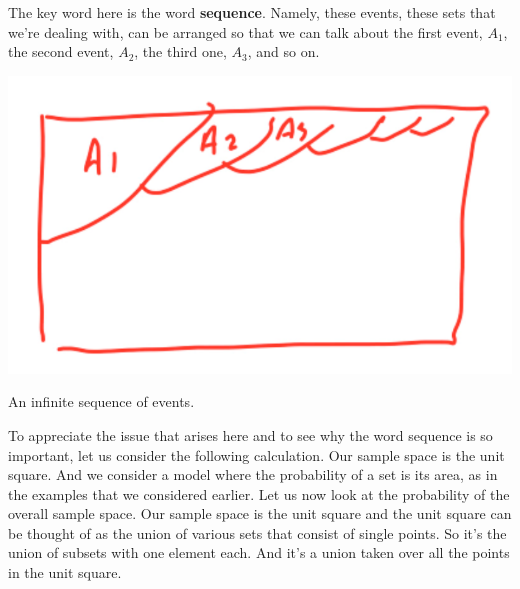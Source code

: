 \documentclass{tufte-handout}
\begin{document}
The key word here is the word \textbf{sequence}. Namely, these events, these sets that we're dealing with, can
be arranged so that we can talk about the first event, $A_1$, the second event, $A_2$, the third one, $A_3$, and
so on.

\begin{marginfigure}
  \includegraphics{EventSequence}
  \caption{An infinite sequence of events.}
\end{marginfigure}


To appreciate the issue that arises here and to see why the word sequence is so important, let us
consider the following calculation. Our sample space is the unit square. And we consider a model where
the probability of a set is its area, as in the examples that we considered earlier. Let us now look at the
probability of the overall sample space. Our sample space is the unit square and the unit square can be
thought of as the union of various sets that consist of single points. So it's the union of subsets with one
element each. And it's a union taken over all the points in the unit square.
\end{document}
